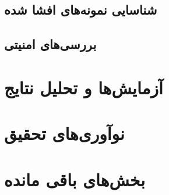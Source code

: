 \documentclass[10pt, a4paper]{article}
\begin{document}
\subsection{شناسایی نمونه‌های افشا شده}

\subsection{بررسی‌های امنیتی}

\section{آزمایش‌ها و تحلیل نتایج}

\section{نوآوری‌های تحقیق}

\section{بخش‌های باقی مانده}
\end{document}

